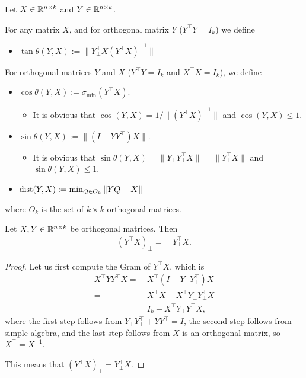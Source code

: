 \begin{definition}\label{def:angle_and_distance}
Let $X \in \mathbb{R}^{n \times k}$ and $Y \in \mathbb{R}^{n \times k}$.

For any matrix $X$, and for orthogonal matrix $Y$ ($Y^\top Y = I_k$) we define
\begin{itemize}
    \item $\tan \theta(Y,X) := \| Y_{\bot}^\top X ( Y^\top X )^{-1} \|$
\end{itemize}
For orthogonal matrices $Y$ and $X$ ($Y^\top Y = I_k$ and $X^\top X = I_k$), we define %
\begin{itemize}
    \item $\cos \theta (Y,X) := \sigma_{\min} (Y^\top X)$. 
    \begin{itemize} 
        \item It is obvious that $\cos (Y,X) = 1/ \| (Y^\top X)^{-1} \|$ and $\cos(Y,X) \leq 1$.
    \end{itemize}
    \item $\sin \theta(Y,X) := \| (I - Y Y^\top) X \|$.
    \begin{itemize} 
        \item It is obvious that $\sin \theta(Y,X) = \| Y_{\bot} Y_{\bot}^\top X \| = \| Y_{\bot}^\top X \|$ and $\sin \theta(Y,X) \leq 1$.
    \end{itemize}
    \item $\operatorname{dist}(Y,X) := \min_{Q \in O_k} \| YQ - X \|$
\end{itemize}  
where $O_k$ is the set of $k \times k$ orthogonal matrices. 
\end{definition}

\begin{lemma}
\label{lem:trig_structural}
Let $X, Y\in \mathbb{R}^{n\times k}$ be orthogonal matrices. Then
\begin{align*}
    (Y^\top X)_\bot = & ~ Y_\bot^\top X.
\end{align*}
\end{lemma}

\begin{proof}
    Let us first compute the Gram of $Y^\top X$, which is
\begin{align*}
    X^\top YY^\top X 
    = & ~ X^\top (I-Y_\bot Y_\bot^\top) X \\
    = & ~ X^\top X-X^\top Y_\bot Y_\bot^\top X \\
    = & ~ I_k-X^\top Y_\bot Y_\bot^\top X,
\end{align*}
where the first step follows from $Y_\bot Y_\bot^\top + YY^\top = I$, the second step follows from simple algebra, and the last step follows from $X$ is an orthogonal matrix, so $X^\top = X^{-1}$.

This means that $(Y^\top X)_\bot=Y_\bot^\top X$.
\end{proof}

